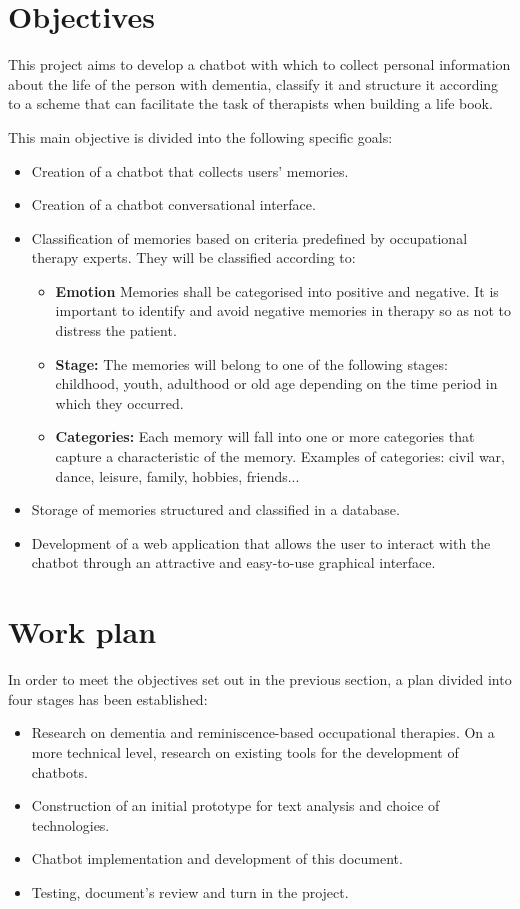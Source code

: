 \section{Objectives}

This project aims to develop a chatbot with which to collect personal information about the life of the person with dementia, classify it and structure it according to a scheme that can facilitate the task of therapists when building a life book.

This main objective is divided into the following specific goals:
\begin{itemize}
	\item Creation of a chatbot that collects users' memories.
	\item Creation of a chatbot conversational interface.
	\item Classification of memories based on criteria predefined by occupational therapy experts. They will be classified according to:
	\begin{itemize}
		\item \textbf{Emotion} Memories shall be categorised into positive and negative. It is important to identify and avoid negative memories in therapy so as not to distress the patient.
		\item \textbf{Stage:} The memories will belong to one of the following stages: childhood, youth, adulthood or old age depending on the time period in which they occurred.
		\item \textbf{Categories:} Each memory will fall into one or more categories that capture a characteristic of the memory. Examples of categories: civil war, dance, leisure, family, hobbies, friends...
	\end{itemize}
	\item Storage of memories structured and classified in a database.
	\item Development of a web application that allows the user to interact with the chatbot through an attractive and easy-to-use graphical interface.
\end{itemize}

\section{Work plan}

In order to meet the objectives set out in the previous section, a plan divided into four stages has been established:
\begin{itemize}
	\item Research on dementia and reminiscence-based occupational therapies. On a more technical level, research on existing tools for the development of chatbots.
	\item Construction of an initial prototype for text analysis and choice of technologies.
	\item Chatbot implementation and development of this document.
	\item Testing, document's review and turn in the project.
\end{itemize}








